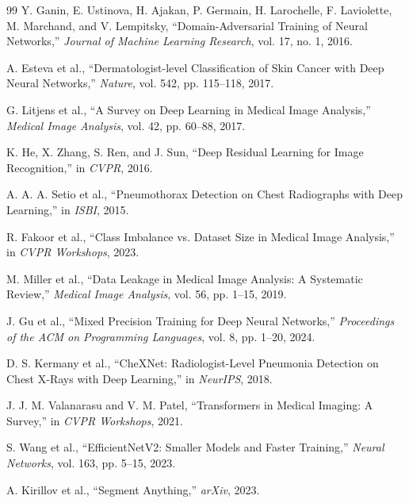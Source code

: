 \documentclass[conference,a4paper]{IEEEtran}
\begin{document}
\begin{thebibliography}{99}
Y. Ganin, E. Ustinova, H. Ajakan, P. Germain, H. Larochelle, F. Laviolette, M. Marchand, and V. Lempitsky, ``Domain-Adversarial Training of Neural Networks,'' \emph{Journal of Machine Learning Research}, vol. 17, no. 1, 2016.

A. Esteva et al., ``Dermatologist-level Classification of Skin Cancer with Deep Neural Networks,'' \emph{Nature}, vol. 542, pp. 115--118, 2017.

G. Litjens et al., ``A Survey on Deep Learning in Medical Image Analysis,'' \emph{Medical Image Analysis}, vol. 42, pp. 60--88, 2017.

K. He, X. Zhang, S. Ren, and J. Sun, ``Deep Residual Learning for Image Recognition,'' in \emph{CVPR}, 2016.

A. A. A. Setio et al., ``Pneumothorax Detection on Chest Radiographs with Deep Learning,'' in \emph{ISBI}, 2015.

R. Fakoor et al., ``Class Imbalance vs. Dataset Size in Medical Image Analysis,'' in \emph{CVPR Workshops}, 2023.

M. Miller et al., ``Data Leakage in Medical Image Analysis: A Systematic Review,'' \emph{Medical Image Analysis}, vol. 56, pp. 1--15, 2019.

J. Gu et al., ``Mixed Precision Training for Deep Neural Networks,'' \emph{Proceedings of the ACM on Programming Languages}, vol. 8, pp. 1--20, 2024.

D. S. Kermany et al., ``CheXNet: Radiologist-Level Pneumonia Detection on Chest X-Rays with Deep Learning,'' in \emph{NeurIPS}, 2018.

J. J. M. Valanarasu and V. M. Patel, ``Transformers in Medical Imaging: A Survey,'' in \emph{CVPR Workshops}, 2021.

S. Wang et al., ``EfficientNetV2: Smaller Models and Faster Training,'' \emph{Neural Networks}, vol. 163, pp. 5--15, 2023.

A. Kirillov et al., ``Segment Anything,'' \emph{arXiv}, 2023.

\end{thebibliography}
\end{document}
